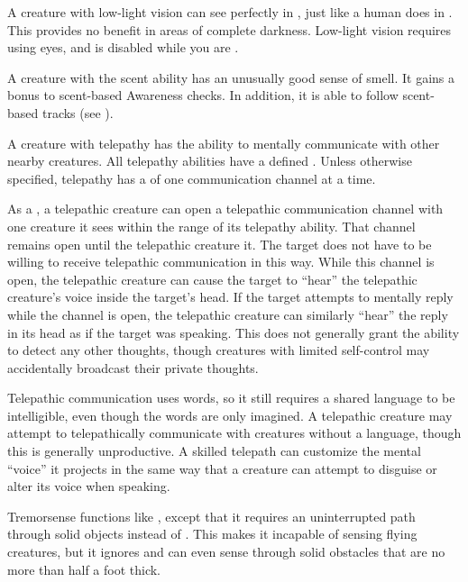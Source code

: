   A creature with low-light vision can see perfectly in , just like a human does in .
  This provides no benefit in areas of complete darkness.
  Low-light vision requires using eyes, and is disabled while you are \dazzled.

  A creature with the scent ability has an unusually good sense of smell.
  It gains a  bonus to scent-based Awareness checks.
  In addition, it is able to follow scent-based tracks (see ).

  A creature with telepathy has the ability to mentally communicate with other nearby creatures.
  All telepathy abilities have a defined .
  Unless otherwise specified, telepathy has a  of one communication channel at a time.

  As a , a telepathic creature can open a telepathic communication channel with one creature it sees within the range of its telepathy ability.
  That channel remains open until the telepathic creature  it.
  The target does not have to be willing to receive telepathic communication in this way.
  While this channel is open, the telepathic creature can cause the target to ``hear'' the telepathic creature's voice inside the target's head.
  If the target attempts to mentally reply while the channel is open, the telepathic creature can similarly ``hear'' the reply in its head as if the target was speaking.
  This does not generally grant the ability to detect any other thoughts, though creatures with limited self-control may accidentally broadcast their private thoughts.

  Telepathic communication uses words, so it still requires a shared language to be intelligible, even though the words are only imagined.
  A telepathic creature may attempt to telepathically communicate with creatures without a language, though this is generally unproductive.
  A skilled telepath can customize the mental ``voice'' it projects in the same way that a creature can attempt to disguise or alter its voice when speaking.

  Tremorsense functions like , except that it requires an uninterrupted path through solid objects instead of .
  This makes it incapable of sensing flying creatures, but it ignores  and can even sense through solid obstacles that are no more than half a foot thick.

